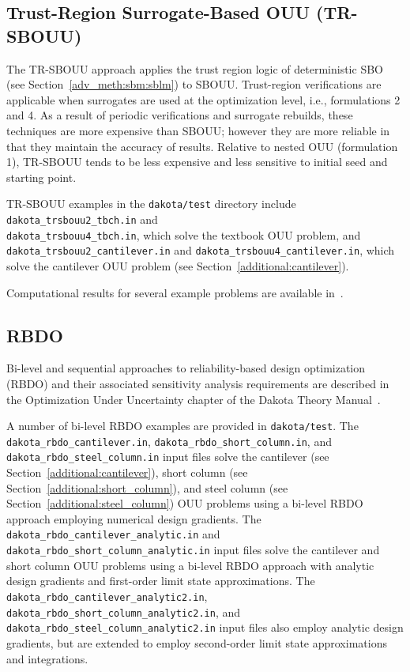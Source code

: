 \subsection{Trust-Region Surrogate-Based OUU (TR-SBOUU)}\label{adv_models:ouu:trsb}

The TR-SBOUU approach applies the trust region logic of deterministic
SBO (see Section~\ref{adv_meth:sbm:sblm}) to SBOUU. Trust-region verifications
are applicable when surrogates are used at the optimization level,
i.e., formulations 2 and 4. As a result of periodic verifications and
surrogate rebuilds, these techniques are more expensive than SBOUU;
however they are more reliable in that they maintain the accuracy of
results. Relative to nested OUU (formulation 1), TR-SBOUU tends to be
less expensive and less sensitive to initial seed and starting point.

TR-SBOUU examples in the \texttt{dakota/test} directory include
\texttt{dakota\_trsbouu2\_tbch.in} and\\
\texttt{dakota\_trsbouu4\_tbch.in}, which solve the textbook OUU
problem, and\\ \texttt{dakota\_trsbouu2\_cantilever.in} and
\texttt{dakota\_trsbouu4\_cantilever.in}, which solve the cantilever
OUU problem (see Section~\ref{additional:cantilever}).

Computational results for several example problems are available
in~\cite{Eld02}.

\subsection{RBDO} \label{adv_models:ouu:rbdo}

Bi-level and sequential approaches to reliability-based design
optimization (RBDO) and their associated sensitivity analysis
requirements are described in the Optimization Under Uncertainty
chapter of the Dakota Theory Manual~\cite{TheoMan}.

A number of bi-level RBDO examples are provided in \texttt{dakota/test}.
The \texttt{dakota\_rbdo\_cantilever.in},
\texttt{dakota\_rbdo\_short\_column.in}, and
\texttt{dakota\_rbdo\_steel\_column.in} input files solve the
cantilever (see Section~\ref{additional:cantilever}), short column
(see Section~\ref{additional:short_column}), and steel column (see
Section~\ref{additional:steel_column}) OUU problems using a bi-level
RBDO approach employing numerical design gradients. The 
\texttt{dakota\_rbdo\_cantilever\_analytic.in} and
\texttt{dakota\_rbdo\_short\_column\_analytic.in} input files solve
the cantilever and short column OUU problems using a bi-level RBDO
approach with analytic design gradients and first-order limit state
approximations. The \texttt{dakota\_rbdo\_cantilever\_analytic2.in},
\texttt{dakota\_rbdo\_short\_column\_analytic2.in}, and
\texttt{dakota\_rbdo\_steel\_column\_analytic2.in} input files also
employ analytic design gradients, but are extended to employ
second-order limit state approximations and integrations.

